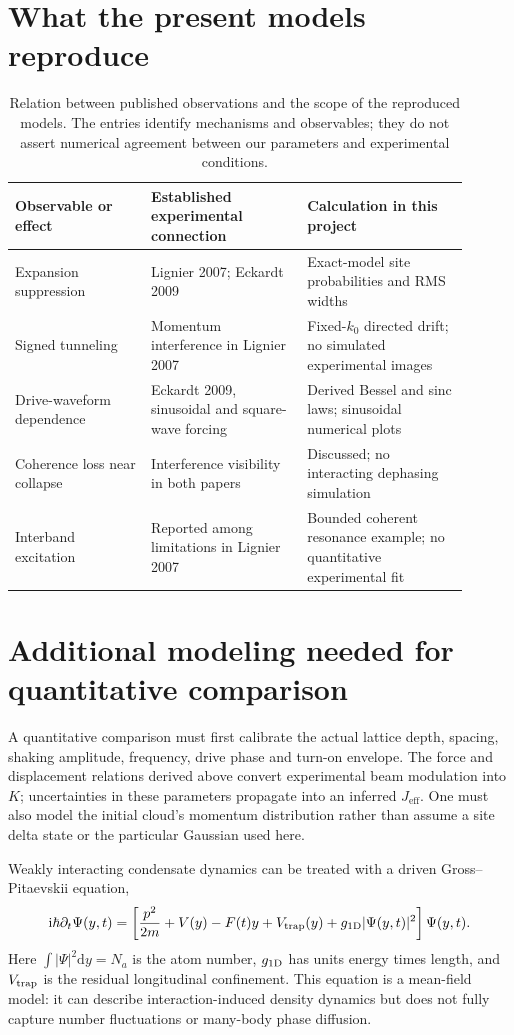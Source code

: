 \documentclass[11pt,oneside]{report}
\numberwithin{equation}{chapter}
\newcommand{\Jeff}{J_{\mathrm{eff}}}
\newcommand{\ii}{\mathrm i}
\newcommand{\dd}{\mathrm d}
\begin{document}
\section{What the present models reproduce}
\begin{table}[!htbp]\centering\small
\begin{tabular}{P{0.27\linewidth}P{0.31\linewidth}P{0.32\linewidth}}\toprule
Observable or effect&Established experimental connection&Calculation in this project\\\midrule
Expansion suppression&Lignier 2007; Eckardt 2009&Exact-model site probabilities and RMS widths\\
Signed tunneling&Momentum interference in Lignier 2007&Fixed-$k_0$ directed drift; no simulated experimental images\\
Drive-waveform dependence&Eckardt 2009, sinusoidal and square-wave forcing&Derived Bessel and sinc laws; sinusoidal numerical plots\\
Coherence loss near collapse&Interference visibility in both papers&Discussed; no interacting dephasing simulation\\
Interband excitation&Reported among limitations in Lignier 2007&Bounded coherent resonance example; no quantitative experimental fit\\\bottomrule
\end{tabular}\caption{Relation between published observations and the scope of the reproduced models. The entries identify mechanisms and observables; they do not assert numerical agreement between our parameters and experimental conditions.}\label{tab:experiment}\end{table}

\section{Additional modeling needed for quantitative comparison}
A quantitative comparison must first calibrate the actual lattice depth, spacing, shaking amplitude, frequency, drive phase and turn-on envelope. The force and displacement relations derived above convert experimental beam modulation into $K$; uncertainties in these parameters propagate into an inferred $\Jeff$. One must also model the initial cloud's momentum distribution rather than assume a site delta state or the particular Gaussian used here.

Weakly interacting condensate dynamics can be treated with a driven Gross--Pitaevskii equation,
\begin{equation}
 \ii\hbar\partial_t\Psi(y,t)=\left[\frac{p^2}{2m}+V(y)-F(t)y+V_{\rm trap}(y)+g_{1\rm D}|\Psi(y,t)|^2\right]\Psi(y,t).
\end{equation}
Here $\int|\Psi|^2\dd y=N_a$ is the atom number, $g_{1\rm D}$ has units energy times length, and $V_{\rm trap}$ is the residual longitudinal confinement. This equation is a mean-field model: it can describe interaction-induced density dynamics but does not fully capture number fluctuations or many-body phase diffusion.
\end{document}
